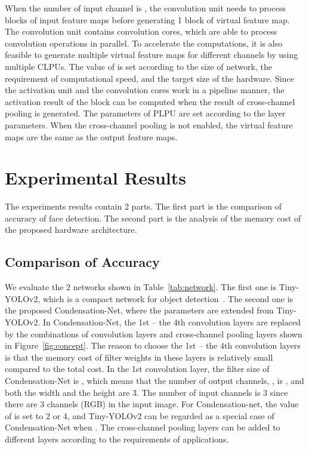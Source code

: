 \documentclass[10pt,twocolumn,letterpaper]{article}
\begin{document}
When the number of input channel is , the convolution unit needs to process  blocks of input feature maps before generating 1 block of virtual feature map. The convolution unit contains  convolution cores, which are able to process  convolution operations in parallel. To accelerate the computations, it is also feasible to generate multiple virtual feature maps for different channels by using multiple CLPUs. The value of  is set according to the size of network, the requirement of computational speed, and the target size of the hardware. Since the activation unit and the convolution cores work in a pipeline manner, the activation result of the block can be computed when the result of cross-channel pooling is generated. The parameters of PLPU are set according to the layer parameters. When the cross-channel pooling is not enabled, the virtual feature maps are the same as the output feature maps.

\section{Experimental Results}
\label{sec:results}

The experiments results contain 2 parts. The first part is the comparison of accuracy of face detection. The second part is the analysis of the memory cost of the proposed hardware architecture.



\subsection{Comparison of Accuracy}
\label{subsec:comparison}

We evaluate the 2 networks shown in Table~\ref{tab:network}. The first one is Tiny-YOLOv2, which is a compact network for object detection~\cite{Redmon17, Wai18}. The second one is the proposed Condensation-Net, where the parameters are extended from Tiny-YOLOv2. In Condensation-Net, the 1st -- the 4th convolution layers are replaced by the combinations of convolution layers and cross-channel pooling layers shown in Figure~\ref{fig:concept}. The reason to choose the 1st -- the 4th convolution layers is that the memory cost of filter weights in these layers is relatively small compared to the total cost. In the 1st convolution layer, the filter size of Condensation-Net is , which means that the number of output channels, , is , and both the width and the height are 3. The number of input channels is 3 since there are 3 channels (RGB) in the input image. For Condensation-net, the value of  is set to 2 or 4, and Tiny-YOLOv2 can be regarded as a special case of Condensation-Net when . The cross-channel pooling layers can be added to different layers according to the requirements of applications.
\end{document}
